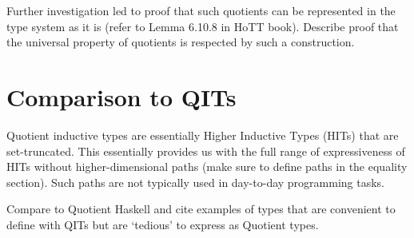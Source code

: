 \documentclass[11pt]{article}
\begin{document}
Further investigation led to proof that such quotients can be represented in the type system as it is (refer to Lemma 6.10.8 in HoTT book). Describe proof that the universal property of quotients is respected by such a construction.

\section{Comparison to QITs}
Quotient inductive types are essentially Higher Inductive Types (HITs) that are set-truncated. This essentially provides us with the full range of expressiveness of HITs without higher-dimensional paths (make sure to define paths in the equality section). Such paths are not typically used in day-to-day programming tasks.

Compare to Quotient Haskell and cite examples of types that are convenient to define with QITs but are `tedious' to express as Quotient types.
\end{document}
